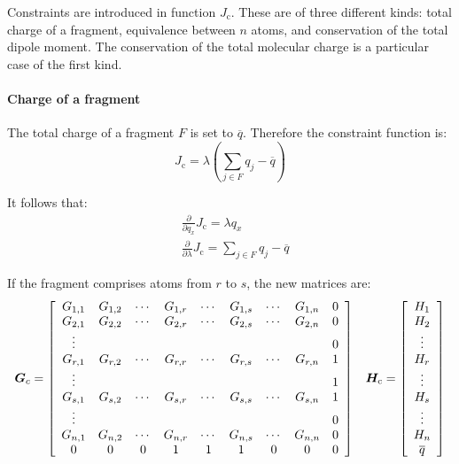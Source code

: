 \documentclass[a4paper]{report}
\newcommand{\bs}{\boldsymbol}
\newcommand{\mr}{\mathrm}
\begin{document}
Constraints are introduced in function $J_\mr{c}$. These are of three different kinds:
total charge of a fragment, equivalence between $n$ atoms, and conservation of the
total dipole moment. The conservation of the total molecular charge is a particular
case of the first kind.

\paragraph{Charge of a fragment}

The total charge of a fragment $F$ is set to $\overline{q}$. Therefore the constraint
function is:
\begin{equation}
J_\mr{c} = \lambda\left(\sum_{j\in F} q_j - \overline{q} \right) 
\end{equation}

It follows that:
\begin{align}
&\frac{\partial}{\partial q_x} J_\mr{c} = \lambda q_x \\
&\frac{\partial}{\partial \lambda} J_\mr{c} = \sum_{j\in F} q_j - \overline{q}
\end{align}

If the fragment comprises atoms from $r$ to $s$, the new matrices are:
\begin{equation}
\bs{G}_c = \left[ \begin{array}{ccccccccc} 
G_{1,1} & G_{1,2} & \cdots & G_{1,r} & \cdots & G_{1,s} & \cdots & G_{1,n} & 0 \\
G_{2,1} & G_{2,2} & \cdots & G_{2,r} & \cdots & G_{2,s} & \cdots & G_{2,n} & 0 \\
\vdots  &         &        &         &        &         &        &         & 0 \\
G_{r,1} & G_{r,2} & \cdots & G_{r,r} & \cdots & G_{r,s} & \cdots & G_{r,n} & 1 \\
\vdots  &         &        &         &        &         &        &         & 1 \\
G_{s,1} & G_{s,2} & \cdots & G_{s,r} & \cdots & G_{s,s} & \cdots & G_{s,n} & 1 \\
\vdots  &         &        &         &        &         &        &         & 0 \\
G_{n,1} & G_{n,2} & \cdots & G_{n,r} & \cdots & G_{n,s} & \cdots & G_{n,n} & 0 \\
0       & 0       & 0      & 1       & 1      & 1       & 0      & 0       & 0 \\
\end{array} \right] \hspace{0.3cm} \bs{H}_\mr{c} = \left[ \begin{array}{c} H_1 \\ H_2 \\ \vdots \\ H_r \\ \vdots \\ H_s \\ \vdots \\ H_n \\ \overline{q} \end{array} \right]
\end{equation}
\end{document}
